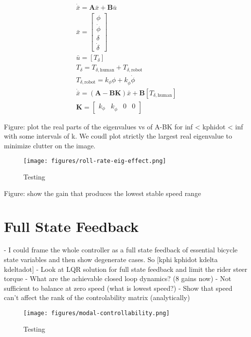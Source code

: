 \documentclass[12pt]{article}
\begin{document}
\begin{align}
  \dot{\bar{x}} = \mathbf{A} \bar{x} + \mathbf{B} \bar{u} \\
  \bar{x} = \begin{bmatrix} \phi \\ \dot{\phi} \\ \delta \\ \dot{\delta} \end{bmatrix} \\
  \bar{u} = \left[ T_\delta \right] \\
  T_\delta = T_{\delta,\textrm{human}} + T_{\delta,\textrm{robot}} \\
  T_{\delta,\textrm{robot}} = k_\phi \phi + k_{\dot{\phi}} \dot{\phi} \\
  \dot{\bar{x}} = \left( \mathbf{A} - \mathbf{B} \mathbf{K} \right) \bar{x} + \mathbf{B} \left[ T_{\delta,\textrm{human}} \right] \\
  \mathbf{K} = \begin{bmatrix} k_\phi & k_{\dot{\phi}} & 0 & 0 \end{bmatrix}
\end{align}

Figure: plot the real parts of the eigenvalues vs of A-BK for inf < kphidot <
inf with some intervals of k. We coudl plot strictly the largest real
eigenvalue to minimize clutter on the image.

\begin{figure}
  \centering
  \texttt{[image: figures/roll-rate-eig-effect.png]}
  \caption{Testing}
  \label{fig:roll-rate-eig-effect}
\end{figure}

Figure: show the gain that produces the lowest stable speed range

\section{Full State Feedback}

- I could frame the whole controller as a full state feedback of essential
bicycle state variables and then show degenerate cases. So [kphi kphidot kdelta
kdeltadot]
- Look at LQR solution for full state feedback and limit the rider steer torque
- What are the achievable closed loop dynamics? (8 gains now)
- Not sufficient to balance at zero speed (what is lowest speed?)
- Show that speed can't affect the rank of the controlability matrix
(analytically)

\begin{figure}
  \centering
  \texttt{[image: figures/modal-controllability.png]}
  \caption{Testing}
  \label{fig:modal-controllability}
\end{figure}
\end{document}
